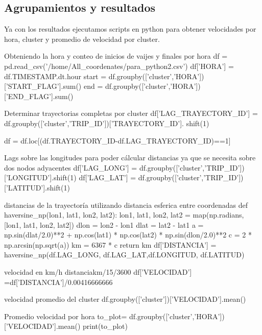 \documentclass[a4paper]{article}
\begin{document}
\subsection{Agrupamientos y resultados}
Ya con los resultados ejecutamos scripts en python para obtener velocidades por hora, cluster y promedio de velocidad por cluster.
\\
\begin{sexylisting}{Obteniendo la hora y conteo de inicios de vaijes y finales por hora}
df = 
pd.read_csv('/home/All_coordenates/para_python2.csv')
df['HORA'] = df.TIMESTAMP.dt.hour
start = 
df.groupby(['cluster','HORA'])['START_FLAG'].sum()
end = 
df.groupby(['cluster','HORA'])['END_FLAG'].sum()
\end{sexylisting}
\begin{sexylisting}{Determinar trayectorias completas por cluster}
df['LAG_TRAYECTORY_ID'] =
df.groupby(['cluster','TRIP_ID'])['TRAYECTORY_ID'].
shift(1)

df = df.loc[(df.TRAYECTORY_ID-df.LAG_TRAYECTORY_ID)==1]
\end{sexylisting}
\begin{sexylisting}{Lags sobre las longitudes para poder cálcular distancias ya que se necesita sobre dos nodos adyacentes}
df['LAG_LONG'] = 
df.groupby(['cluster','TRIP_ID'])['LONGITUD'].shift(1)
df['LAG_LAT'] = 
df.groupby(['cluster','TRIP_ID'])['LATITUD'].shift(1)
\end{sexylisting}
\begin{sexylisting}{distancias de la trayectoría utilizando distancia esferica entre coordenadas}
def haversine_np(lon1, lat1, lon2, lat2):
    lon1, lat1, lon2, lat2 = 
    map(np.radians, [lon1, lat1, lon2, lat2])
    dlon = lon2 - lon1
    dlat = lat2 - lat1
    a = np.sin(dlat/2.0)**2 + 
    np.cos(lat1) * np.cos(lat2) * np.sin(dlon/2.0)**2
    c = 2 * np.arcsin(np.sqrt(a))
    km = 6367 * c
    return km
df['DISTANCIA'] = 
haversine_np(df.LAG_LONG, df.LAG_LAT,df.LONGITUD, df.LATITUD)
\end{sexylisting}

\begin{sexylisting}{velocidad en km/h distanciakm/15/3600}
df['VELOCIDAD'] =df['DISTANCIA']/0.00416666666
\end{sexylisting}

\begin{sexylisting}{velocidad promedio del cluster}
df.groupby(['cluster'])['VELOCIDAD'].mean()
\end{sexylisting}

\begin{sexylisting}{Promedio velocidad por hora}
to_plot=
df.groupby(['cluster','HORA'])['VELOCIDAD'].mean()
print(to_plot)
\end{sexylisting}
\newpage
\end{document}
